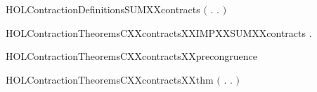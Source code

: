 \newcommand{\HOLContractionDefinitionsOBSXXcontracts}{\UseVerbatim{HOLContractionDefinitionsOBSXXcontracts}}
\begin{SaveVerbatim}{HOLContractionDefinitionsSUMXXcontracts}
\HOLTokenTurnstile{}  \HOLSymConst{\ensuremath{=}} \ensuremath{(}\HOLTokenLambda{} . \HOLSymConst{\HOLTokenForall{}}.  \HOLSymConst{\ensuremath{+}}    \HOLSymConst{\ensuremath{+}} \ensuremath{)}
\end{SaveVerbatim}
\newcommand{\HOLContractionDefinitionsSUMXXcontracts}{\UseVerbatim{HOLContractionDefinitionsSUMXXcontracts}}
\newcommand{\HOLContractionDefinitions}{
\HOLDfnTag{Contraction}{C_contracts}\HOLContractionDefinitionsCXXcontracts
\HOLDfnTag{Contraction}{CONTRACTION}\HOLContractionDefinitionsCONTRACTION
\HOLDfnTag{Contraction}{contracts_def}\HOLContractionDefinitionscontractsXXdef
\HOLDfnTag{Contraction}{OBS_contracts}\HOLContractionDefinitionsOBSXXcontracts
\HOLDfnTag{Contraction}{SUM_contracts}\HOLContractionDefinitionsSUMXXcontracts
}
\begin{SaveVerbatim}{HOLContractionTheoremsCXXcontractsXXIMPXXSUMXXcontracts}
\HOLTokenTurnstile{} \HOLSymConst{\HOLTokenForall{}} .    \HOLSymConst{\HOLTokenImp{}}   
\end{SaveVerbatim}
\newcommand{\HOLContractionTheoremsCXXcontractsXXIMPXXSUMXXcontracts}{\UseVerbatim{HOLContractionTheoremsCXXcontractsXXIMPXXSUMXXcontracts}}
\begin{SaveVerbatim}{HOLContractionTheoremsCXXcontractsXXprecongruence}
\HOLTokenTurnstile{}  
\end{SaveVerbatim}
\newcommand{\HOLContractionTheoremsCXXcontractsXXprecongruence}{\UseVerbatim{HOLContractionTheoremsCXXcontractsXXprecongruence}}
\begin{SaveVerbatim}{HOLContractionTheoremsCXXcontractsXXthm}
\HOLTokenTurnstile{}  \HOLSymConst{\ensuremath{=}} \ensuremath{(}\HOLTokenLambda{} . \HOLSymConst{\HOLTokenForall{}}.   \HOLSymConst{\HOLTokenImp{}}     \ensuremath{)}
\end{SaveVerbatim}
\newcommand{\HOLContractionTheoremsCXXcontractsXXthm}{\UseVerbatim{HOLContractionTheoremsCXXcontractsXXthm}}
